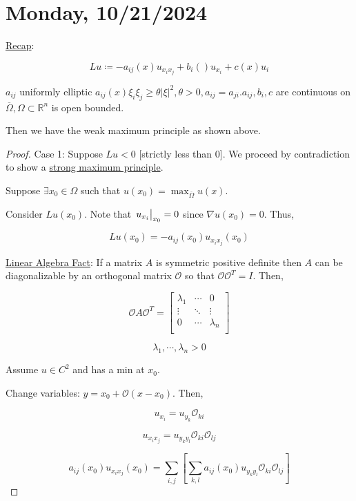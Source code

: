 \documentclass{article}
\theoremstyle{definition}
\begin{document}
\section*{Monday, 10/21/2024}

\underline{Recap}:

\[
    Lu \coloneqq -a_{ij} (x) u_{x_i x_j} + b_{i} () u_{x_i} + c(x) u_{i}  
\]

\(a_{ij}\) uniformly elliptic \(a_{ij} (x) \xi_i \xi_j \geq \theta \vert \xi \vert ^ 2, \theta > 0, a_{ij} = a_{ji}. a_{ij}, b_i, c\) are continuous on \(\overline{\Omega}, \Omega \subset \mathbb{R}^n\) is open bounded.

Then we have the weak maximum principle as shown above. 

\begin{proof}
    Case 1: Suppose \(Lu < 0\) [strictly less than \(0\)]. We proceed by contradiction to show a \underline{strong maximum principle}.

    Suppose \(\exists x_0 \in \Omega\) such that \(u(x_0)=\max_{\overline{\Omega}} u(x)\).

    Consider \(Lu(x_0)\). Note that \(\eval{u_{x_i}}_{x_0} = 0\) since \(\nabla u(x_0)=0\). Thus,

    \[
        Lu(x_0) = -a_{ij}(x_0) u_{x_i x_j}(x_0)  
    \]

    \underline{Linear Algebra Fact}: If a matrix \(A\) is symmetric positive definite then \(A\) can be diagonalizable by an orthogonal matrix \(\mathcal{O}\) so that \(\mathcal{O} \mathcal{O}^T = I\). Then,
    
    \[
        \mathcal{O} A \mathcal{O}^T = \begin{bmatrix}
            \lambda_1 & \cdots &  0 \\
            \vdots & \ddots & \vdots  \\
            0 & \cdots &  \lambda_n \\
        \end{bmatrix}
    \]

    \[
        \lambda_1, \cdots , \lambda_n > 0
    \]

    Assume \(u\in C^2\) and has a min at \(x_0\).

    Change variables: \(y = x_0 + \mathcal{O} (x - x_0)\). Then,

    \[
        u_{x_i} = u_{y_k} \mathcal{O}_{ki}
    \]

    \[
        u_{x_i x_j} = u_{y_k y_l} \mathcal{O}_{ki} \mathcal{O}_{lj}
    \]

    \[
        a_{ij} (x_0) u_{x_i x_j}(x_0) = \sum_{i,j} \left[ \sum_{k,l} a_{ij} (x_0) u_{y_k y_l} \mathcal{O}_{ki} \mathcal{O}_{lj}  \right] 
    \]


\end{proof}
\end{document}
